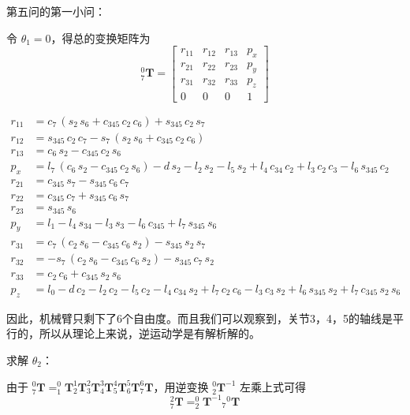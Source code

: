 \documentclass{homework}
\begin{document}
\begin{sol}
第五问的第一小问：

令 $ \theta_1 = 0 $，得总的变换矩阵为
\[
  _7^0\mathbf{T} =
  \begin{bmatrix} 
r_{11} & r_{12} & r_{13} & p_x \\ 
r_{21} & r_{22} & r_{23} & p_y \\ 
r_{31} & r_{32} & r_{33} & p_z \\ 
0 & 0 & 0 & 1
\end{bmatrix}
\] 

\begin{align*} 
r_{11} &= c_{7}\,\left(s_{2}\,s_{6}+c_{345}\,c_{2}\,c_{6}\right)+s_{345}\,c_{2}\,s_{7} \\ 
r_{12} &= s_{345}\,c_{2}\,c_{7}-s_{7}\,\left(s_{2}\,s_{6}+c_{345}\,c_{2}\,c_{6}\right) \\ 
r_{13} &= c_{6}\,s_{2}-c_{345}\,c_{2}\,s_{6} \\ 
p_x &= l_{7}\,\left(c_{6}\,s_{2}-c_{345}\,c_{2}\,s_{6}\right)-d\,s_{2}-l_{2}\,s_{2}-l_{5}\,s_{2}+l_{4}\,c_{34}\,c_{2}+l_{3}\,c_{2}\,c_{3}-l_{6}\,s_{345}\,c_{2} \\ 
r_{21} &= c_{345}\,s_{7}-s_{345}\,c_{6}\,c_{7} \\ 
r_{22} &= c_{345}\,c_{7}+s_{345}\,c_{6}\,s_{7} \\ 
r_{23} &= s_{345}\,s_{6} \\ 
p_y &= l_{1}-l_{4}\,s_{34}-l_{3}\,s_{3}-l_{6}\,c_{345}+l_{7}\,s_{345}\,s_{6} \\ 
r_{31} &= c_{7}\,\left(c_{2}\,s_{6}-c_{345}\,c_{6}\,s_{2}\right)-s_{345}\,s_{2}\,s_{7} \\ 
r_{32} &= -s_{7}\,\left(c_{2}\,s_{6}-c_{345}\,c_{6}\,s_{2}\right)-s_{345}\,c_{7}\,s_{2} \\ 
r_{33} &= c_{2}\,c_{6}+c_{345}\,s_{2}\,s_{6} \\ 
p_z &= l_{0}-d\,c_{2}-l_{2}\,c_{2}-l_{5}\,c_{2}-l_{4}\,c_{34}\,s_{2}+l_{7}\,c_{2}\,c_{6}-l_{3}\,c_{3}\,s_{2}+l_{6}\,s_{345}\,s_{2}+l_{7}\,c_{345}\,s_{2}\,s_{6}
\end{align*}

因此，机械臂只剩下了6个自由度。而且我们可以观察到，关节3，4，5的轴线是平行的，所以从理论上来说，逆运动学是有解析解的。

求解 $ \theta_2 $：

由于 $ _7^0\mathbf{T} = _1^0\mathbf{T} _2^1\mathbf{T} _3^2\mathbf{T} _4^3\mathbf{T} _5^4\mathbf{T} _6^5\mathbf{T} _7^6\mathbf{T} $，用逆变换 $ _2^0\mathbf{T}^{-1} $ 左乘上式可得
\[
  _7^2\mathbf{T} = _2^0\mathbf{T}^{-1} {_7}^0\mathbf{T}
\]


\end{sol}
\end{document}

